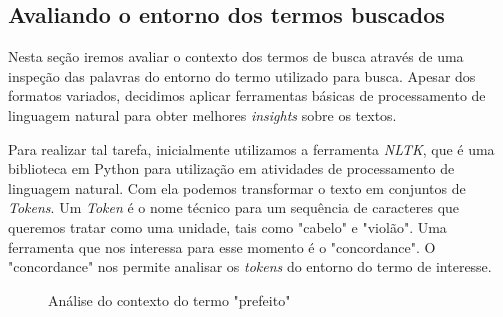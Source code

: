 \documentclass[10pt, a4paper]{article}
\begin{document}




\subsection{Avaliando o entorno dos termos buscados}


Nesta seção iremos avaliar o contexto dos termos de busca através de uma inspeção das palavras do entorno do termo utilizado para busca.
Apesar dos formatos variados, decidimos aplicar ferramentas básicas de processamento de linguagem natural para obter melhores \textit{insights} sobre os textos. 

Para realizar tal tarefa, inicialmente utilizamos a ferramenta \textit{NLTK}, que é uma biblioteca em Python para utilização em atividades de processamento de linguagem natural. Com ela podemos transformar o texto em conjuntos de \textit{Tokens}. Um \textit{Token} é o nome técnico para um sequência de caracteres que queremos tratar como uma unidade, tais como "cabelo" e "violão". 
Uma ferramenta que nos interessa para esse momento é o "concordance". O "concordance" nos permite analisar os \textit{tokens} do entorno do termo de interesse. 


\begin{figure}[H]
    \centering
    \hfill
    
    \hfill
   
    \hfill
   
    \caption{Análise do contexto do termo "prefeito"}
    \label{fig:termo_prefeito}
\end{figure}
\end{document}

